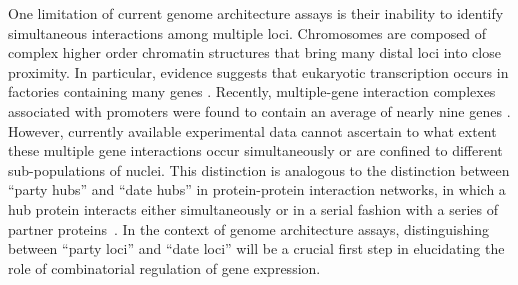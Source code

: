 One limitation of current genome architecture assays is their
inability to identify simultaneous interactions among multiple
loci. Chromosomes are composed of complex higher order chromatin
structures that bring many distal loci into close proximity.  In
particular, evidence suggests that eukaryotic transcription occurs in
factories containing many genes \citep{cook:organization}.
Recently, multiple-gene
interaction complexes associated with promoters were found to contain
an average of nearly nine genes \citep{li:extensive}. However, currently
available experimental data cannot ascertain to what extent these
multiple gene interactions occur simultaneously or are confined to
different sub-populations of nuclei. This distinction is analogous to
the distinction between ``party hubs'' and ``date hubs'' in
protein-protein interaction networks, in which a hub protein interacts
either simultaneously or in a serial fashion with a series of partner
proteins~\citep{han:evidence}. In the context of genome architecture assays,
distinguishing between ``party loci'' and ``date loci'' will be a
crucial first step in elucidating the role of combinatorial regulation
of gene expression.

